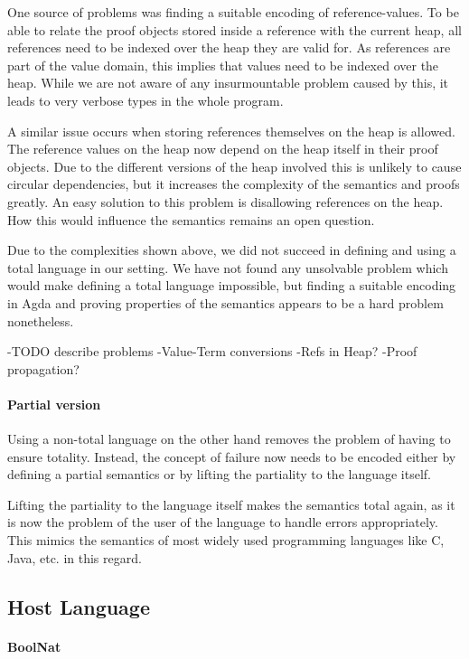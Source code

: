\documentclass[12pt, a4paper, oneside]{article}
\begin{document}
One source of problems was finding a suitable encoding of reference-values. To be able to relate the proof
objects stored inside a reference with the current heap, all references need to be indexed over the heap
they are valid for. As references are part of the value domain, this implies that values need to be
indexed over the heap. While we are not aware of any insurmountable problem caused by this, it leads
to very verbose types in the whole program.

A similar issue occurs when storing references themselves on the heap is allowed. The reference
values on the heap now depend on the heap itself in their proof objects. Due to the different
versions of the heap involved this is unlikely to cause circular dependencies, but it increases
the complexity of the semantics and proofs greatly.
An easy solution to this problem is disallowing references on the heap. How this would influence
the semantics remains an open question.


Due to the complexities shown above, we did not succeed in defining and using a total
language in our setting. We have not found any unsolvable problem which would make
defining a total language impossible, but finding a suitable encoding in Agda
and proving properties of the semantics appears to be a hard problem nonetheless.

-TODO describe problems
-Value-Term conversions
-Refs in Heap?
-Proof propagation?


\paragraph{Partial version}
Using a non-total language on the other hand removes the problem of having to ensure totality.
Instead, the concept of failure now needs to be encoded either by defining a partial semantics
or by lifting the partiality to the language itself.

Lifting the partiality to the language itself makes the semantics total again, as it is now
the problem of the user of the language to handle errors appropriately. This mimics the semantics
of most widely used programming languages like C, Java, etc. in this regard.



\subsection{Host Language}
\paragraph{BoolNat}
\end{document}
